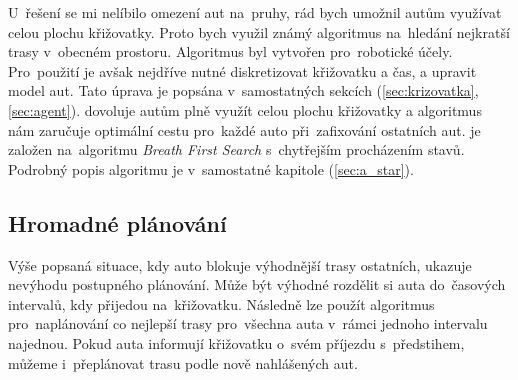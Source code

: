 U~řešení \citet{Dresner} se mi nelíbilo omezení aut na~pruhy, rád bych umožnil autům využívat celou plochu křižovatky.
Proto bych využil známý  algoritmus na~hledání nejkratší trasy v~obecném prostoru.
Algoritmus byl vytvořen \citet*{Hart1968} pro~robotické účely.
Pro~použití  je avšak nejdříve nutné diskretizovat křižovatku a čas, a upravit model aut.
Tato úprava je popsána v~samostatných sekcích (\ref{sec:krizovatka}, \ref{sec:agent}).
 dovoluje autům plně využít celou plochu křižovatky a algoritmus nám zaručuje optimální cestu pro~každé auto při~zafixování ostatních aut.
 je založen na~algoritmu \emph{Breath First Search} s~chytřejším procházením stavů.
Podrobný popis algoritmu je v~samostatné kapitole (\ref{sec:a_star}).

\subsection{Hromadné plánování}\label{subsec:hromadne_planovani}


Výše popsaná situace, kdy auto blokuje výhodnější trasy ostatních, ukazuje nevýhodu postupného plánování.
Může být výhodné rozdělit si auta do~časových intervalů, kdy přijedou na~křižovatku.
Následně lze použít algoritmus pro~naplánování co nejlepší trasy pro~všechna auta v~rámci jednoho intervalu najednou.
Pokud auta informují křižovatku o~svém příjezdu s~předstihem, můžeme i~přeplánovat trasu podle nově nahlášených aut.

%
%
%


